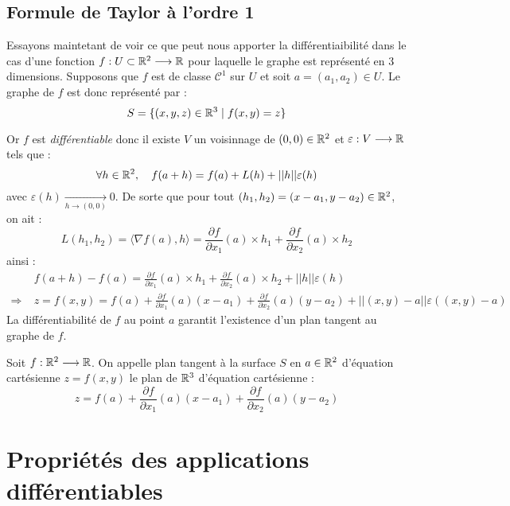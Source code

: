 \subsection{Formule de Taylor à l'ordre 1}

Essayons maintetant de voir ce que peut nous apporter la différentiaibilité dans le cas d'une fonction 
$f : U \subset \mathbb{R}^2 \longrightarrow \mathbb{R}$ pour laquelle le graphe est représenté en 3 dimensions. 
Supposons que $f$ est de classe $ \mathcal{C}^1$ sur $U$ et soit $ a = (a_1, a_2) \in U$. 
Le graphe de $f$ est donc représenté par : 
    \[ S = \{(x,y,z) \in \mathbb{R}^3 \; | \; f(x,y) = z\} \] 

Or $f$ est \emph{différentiable} donc il existe $V$ un voisinnage de $(0,0) \in \mathbb{R}^2$ et 
$\varepsilon : V \longrightarrow \mathbb{R}$ tels que : 
    \[ \forall h \in \mathbb{R}^2, \quad f(a + h) = f(a) + L(h) + ||h|| \varepsilon (h) \] 
avec $ \varepsilon(h) \underset{h \to (0,0)}{\longrightarrow} 0$. De sorte que pour tout $ (h_1, h_2) = (x - a_1, y -a_2) \in \mathbb{R}^2$, on ait :
    \[ 
        L(h_1, h_2) = \langle \nabla f(a) , h \rangle 
        = \frac{ \partial f}{ \partial x_1}(a) \times h_1 + \frac{ \partial  f}{ \partial x_2}(a) \times h_2 
    \]     
ainsi : 
    \begin{align*}
        & f(a + h) - f(a) = \frac{ \partial f}{ \partial x_1}(a) \times h_1 + \frac{ \partial  f}{ \partial x_2}(a) \times h_2 + ||h|| \varepsilon(h) \\ 
        \Longrightarrow \; & z = f(x, y) = f(a) + \frac{ \partial f}{ \partial x_1}(a) (x - a_1) + \frac{ \partial f}{ \partial x_2}(a) (y - a_2) + ||(x,y) - a|| \varepsilon((x,y) - a) 
    \end{align*}
La différentiabilité de $f$ au point $a$ garantit l'existence d'un plan tangent au graphe de $f$. 

\begin{definition}
    Soit $f : \mathbb{R}^2 \longrightarrow \mathbb{R}$. On appelle plan tangent à la surface $S$ en $a \in \mathbb{R}^2$ d'équation cartésienne 
    $z = f(x,y)$ le plan de $\mathbb{R}^3$ d'équation cartésienne : 
        \[ \boxed{z = f(a) + \frac{ \partial f}{ \partial x_1} (a) (x - a_1) + \frac{ \partial f}{ \partial x_2} (a) (y - a_2) } \] 
\end{definition}


\section{Propriétés des applications différentiables}

